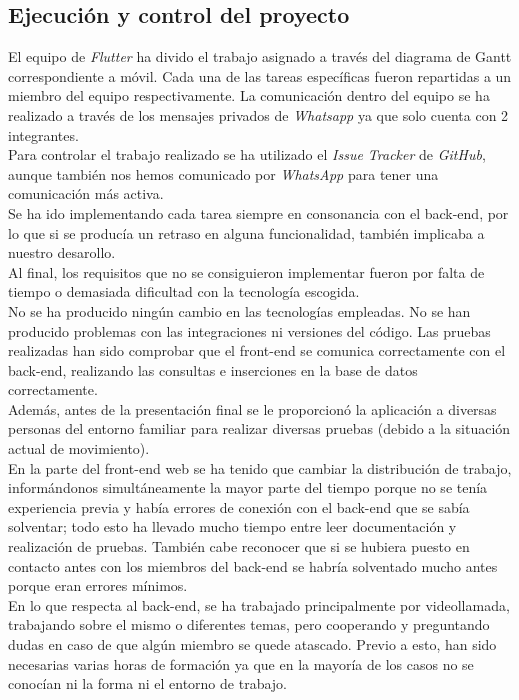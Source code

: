\documentclass{article}
\begin{document}
\subsection{Ejecución y control del proyecto}
El equipo de \textit{Flutter} ha divido el trabajo asignado a través del diagrama de Gantt correspondiente a móvil. Cada una de las tareas específicas fueron repartidas a un miembro del equipo respectivamente. La comunicación dentro del equipo se ha realizado a través de los mensajes privados de \textit{Whatsapp} ya que solo cuenta con 2 integrantes.\\
Para controlar el trabajo realizado se ha utilizado el \textit{Issue Tracker} de \textit{GitHub}, aunque también nos hemos comunicado por \textit{WhatsApp} para tener una comunicación más activa.\\
\newpage
Se ha ido implementando cada tarea siempre en consonancia con el back-end, por lo que si se producía un retraso en alguna funcionalidad, también implicaba a nuestro desarollo.\\
Al final, los requisitos que no se consiguieron implementar fueron por falta de tiempo o demasiada dificultad con la tecnología escogida.\\
\hfill \break
No se ha producido ningún cambio en las tecnologías empleadas.
No se han producido problemas con las integraciones ni versiones del código.
Las pruebas realizadas han sido comprobar que el front-end se comunica correctamente con el back-end, realizando las consultas e inserciones en la base de datos correctamente.\\
Además, antes de la presentación final se le proporcionó la aplicación a diversas personas del entorno familiar para realizar diversas pruebas (debido a la situación actual de movimiento).\\
\hfill \break
En la parte del front-end web se ha tenido que cambiar la distribución de trabajo, informándonos simultáneamente la mayor parte del tiempo porque no se tenía experiencia previa y había errores de conexión con el back-end que se sabía solventar; todo esto ha llevado mucho tiempo entre leer documentación y realización de pruebas. También cabe reconocer que si se hubiera puesto en contacto antes con los miembros del back-end se habría solventado mucho antes porque eran errores mínimos.\\
\hfill \break
En lo que respecta al back-end, se ha trabajado principalmente por videollamada, trabajando sobre el mismo o diferentes temas, pero cooperando y preguntando dudas en caso de que algún miembro se quede atascado. Previo a esto, han sido necesarias varias horas de formación ya que en la mayoría de los casos no se conocían ni la forma ni el entorno de trabajo. 
\end{document}
